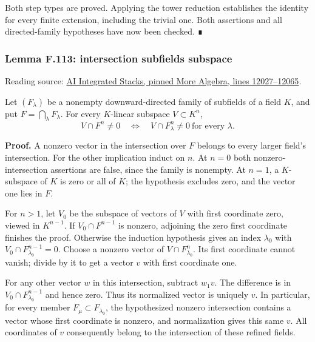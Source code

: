 \documentclass[11pt,a4paper,openany]{report}
\newcounter{none}
\begin{document}
Both step types are proved. Applying the tower reduction establishes the identity for every finite extension, including the trivial one. Both assertions and all directed-family hypotheses have now been checked. ∎

\label{AG-RG-S05-more-algebra-lemma-intersection-subfields-subspace}

\subsubsection{Lemma F.113: intersection subfields subspace}\label{AG-RG-S05-lemma-f.113-intersection-subfields-subspace}

Reading source: \href{https://github.com/KokunoYumeto/unofficial-stacks-project-ai-drafts/blob/565b10e987aba5969b21145a0833f42d69f96790/more-algebra.tex\#L12027-L12065}{AI Integrated Stacks, pinned More Algebra, lines 12027--12065}.

Let \((F_\lambda)\) be a nonempty downward-directed family of subfields of a field \(K\), and put \(F=\bigcap_\lambda F_\lambda\). For every \(K\)-linear subspace \(V\subset K^n\), \[
V\cap F^n\ne0
\quad\Longleftrightarrow\quad
V\cap F_\lambda^n\ne0\ \text{for every }\lambda.
\]

\textbf{Proof.} A nonzero vector in the intersection over \(F\) belongs to every larger field's intersection. For the other implication induct on \(n\). At \(n=0\) both nonzero-intersection assertions are false, since the family is nonempty. At \(n=1\), a \(K\)-subspace of \(K\) is zero or all of \(K\); the hypothesis excludes zero, and the vector one lies in \(F\).

For \(n>1\), let \(V_0\) be the subspace of vectors of \(V\) with first coordinate zero, viewed in \(K^{n-1}\). If \(V_0\cap F^{n-1}\) is nonzero, adjoining the zero first coordinate finishes the proof. Otherwise the induction hypothesis gives an index \(\lambda_0\) with \(V_0\cap F_{\lambda_0}^{n-1}=0\). Choose a nonzero vector of \(V\cap F_{\lambda_0}^n\). Its first coordinate cannot vanish; divide by it to get a vector \(v\) with first coordinate one.

For any other vector \(w\) in this intersection, subtract \(w_1v\). The difference is in \(V_0\cap F_{\lambda_0}^{n-1}\) and hence zero. Thus its normalized vector is uniquely \(v\). In particular, for every member \(F_\mu\subset F_{\lambda_0}\), the hypothesized nonzero intersection contains a vector whose first coordinate is nonzero, and normalization gives this same \(v\). All coordinates of \(v\) consequently belong to the intersection of these refined fields.
\end{document}
